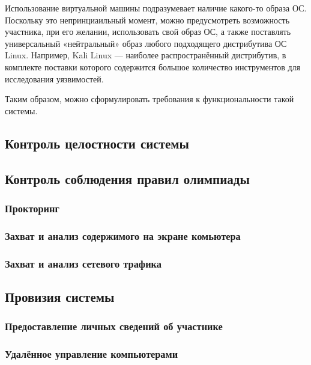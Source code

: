Использование виртуальной машины подразумевает наличие какого-то образа ОС. Поскольку это непринциаильный момент, можно предусмотреть возможность участника, при его желании, использовать свой образ ОС, а также поставлять универсальный «нейтральный» образ любого подходящего дистрибутива ОС Linux. Например, Kali Linux — наиболее распространённый дистрибутив, в комплекте поставки которого содержится большое количество инструментов для исследования уязвимостей.

Таким образом, можно сформулировать требования к функциональности такой системы.

\subsection{Контроль целостности системы}

\subsection{Контроль соблюдения правил олимпиады}

\subsubsection{Прокторинг}

\subsubsection{Захват и анализ содержимого на экране комьютера}

\subsubsection{Захват и анализ сетевого трафика}

\subsection{Провизия системы}

\subsubsection{Предоставление личных сведений об участнике}

\subsubsection{Удалённое управление компьютерами}

